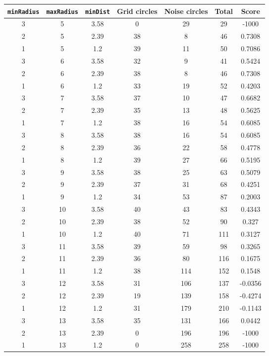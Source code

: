 \documentclass[letterpaper, 12pt]{article}
\begin{document}
\begin{longtable}{|c|c|c|c|c|c|c|}
\hline
\textbf{\texttt{minRadius}} & \textbf{\texttt{maxRadius}} & \textbf{\texttt{minDist}} & \textbf{Grid circles} & \textbf{Noise circles} & \textbf{Total} & \textbf{Score} \\
\hline
3 & 5 & 3.58 & 0 & 29 & 29 & -1000 \\
\hline
2 & 5 & 2.39 & 38 & 8 & 46 & 0.7308 \\
\hline
1 & 5 & 1.2 & 39 & 11 & 50 & 0.7086 \\
\hline
3 & 6 & 3.58 & 32 & 9 & 41 & 0.5424 \\
\hline
2 & 6 & 2.39 & 38 & 8 & 46 & 0.7308 \\
\hline
1 & 6 & 1.2 & 33 & 19 & 52 & 0.4203 \\
\hline
3 & 7 & 3.58 & 37 & 10 & 47 & 0.6682 \\
\hline
2 & 7 & 2.39 & 35 & 13 & 48 & 0.5625 \\
\hline
1 & 7 & 1.2 & 38 & 16 & 54 & 0.6085 \\
\hline
3 & 8 & 3.58 & 38 & 16 & 54 & 0.6085 \\
\hline
2 & 8 & 2.39 & 36 & 22 & 58 & 0.4778 \\
\hline
1 & 8 & 1.2 & 39 & 27 & 66 & 0.5195 \\
\hline
3 & 9 & 3.58 & 38 & 25 & 63 & 0.5079 \\
\hline
2 & 9 & 2.39 & 37 & 31 & 68 & 0.4251 \\
\hline
1 & 9 & 1.2 & 34 & 53 & 87 & 0.2003 \\
\hline
3 & 10 & 3.58 & 40 & 43 & 83 & 0.4343 \\
\hline
2 & 10 & 2.39 & 38 & 52 & 90 & 0.327 \\
\hline
1 & 10 & 1.2 & 40 & 71 & 111 & 0.3127 \\
\hline
3 & 11 & 3.58 & 39 & 59 & 98 & 0.3265 \\
\hline
2 & 11 & 2.39 & 36 & 80 & 116 & 0.1675 \\
\hline
1 & 11 & 1.2 & 38 & 114 & 152 & 0.1548 \\
\hline
3 & 12 & 3.58 & 31 & 106 & 137 & -0.0356 \\
\hline
2 & 12 & 2.39 & 19 & 139 & 158 & -0.4274 \\
\hline
1 & 12 & 1.2 & 31 & 179 & 210 & -0.1143 \\
\hline
3 & 13 & 3.58 & 35 & 131 & 166 & 0.0442 \\
\hline
2 & 13 & 2.39 & 0 & 196 & 196 & -1000 \\
\hline
1 & 13 & 1.2 & 0 & 258 & 258 & -1000 \\

\end{longtable}
\end{document}
